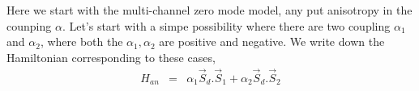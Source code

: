 \documentclass[reprint,prb,superscriptaddress]{revtex4-1}
\begin{document}
\noindent Here we start with the multi-channel zero mode model, any put anisotropy in the counping $\alpha$. Let's start with a simpe possibility where there are two coupling $\alpha_1$ and $\alpha_2$, where both the $\alpha_1,\alpha_2$ are positive and negative. We write down the Hamiltonian corresponding to these cases,
\begin{eqnarray}
H_{an}&=& \alpha_1 \vec{S}_d.\vec{S}_1 + \alpha_2 \vec{S}_d.\vec{S}_2 %
\end{eqnarray}
%
%
%
%
\end{document}
